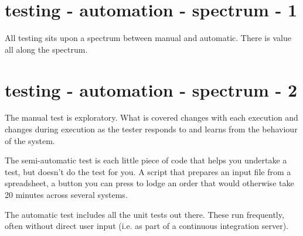 \section*{testing - automation - spectrum - 1}
All testing sits upon a spectrum between manual and automatic. There is value all along the spectrum.


\clearpage
\section*{testing - automation - spectrum - 2}
The manual test is exploratory. What is covered changes with each execution and changes during execution as the tester responds to and learns from the behaviour of the system.

The semi-automatic test is each little piece of code that helps you undertake a test, but doesn't do the test for you. A script that prepares an input file from a spreadsheet, a button you can press to lodge an order that would otherwise take 20 minutes across several systems.

The automatic test includes all the unit tests out there. These run frequently, often without direct user input (i.e. as part of a continuous integration server).